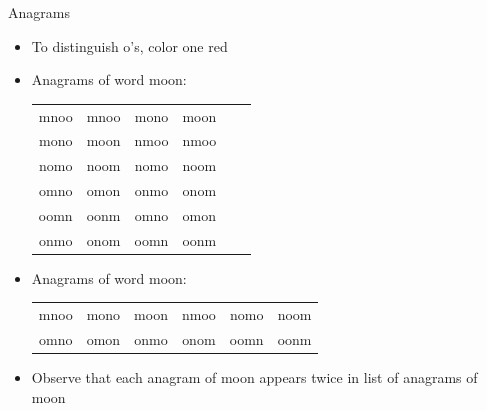 \documentclass{beamer}
\theoremstyle{definition}
\begin{document}

\begin{frame}{Anagrams}
\begin{itemize}
\item To distinguish o's, color one red
\item Anagrams of word mo\alert{o}n:
\begin{tabular}{cccccc}
mno\alert{o}&mn\alert{o}o&mon\alert{o}&mo\alert{o}n\\
m\alert{o}no&m\alert{o}on&nmo\alert{o}&nm\alert{o}o\\
nom\alert{o}&no\alert{o}m&n\alert{o}mo&n\alert{o}om\\
omn\alert{o}&om\alert{o}n&onm\alert{o}&on\alert{o}m\\
o\alert{o}mn&o\alert{o}nm&\alert{o}mno&\alert{o}mon\\
\alert{o}nmo&\alert{o}nom&\alert{o}omn&\alert{o}onm
\end{tabular}
\item Anagrams of word moon:
\begin{tabular}{cccccc}
mnoo &mono &moon &nmoo &nomo &noom\\
omno &omon &onmo &onom &oomn &oonm 
\end{tabular}
\item Observe that each anagram of moon
appears \alert{twice} in list of anagrams of mo\alert{o}n 
\end{itemize}
\end{frame}
\end{document}
